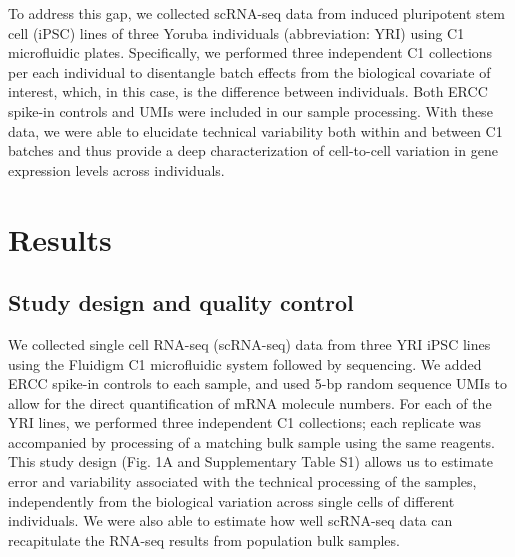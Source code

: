 To address this gap, we collected scRNA-seq data from induced
pluripotent stem cell (iPSC) lines of three Yoruba individuals
(abbreviation: YRI) using C1 microfluidic plates. Specifically, we
performed three independent C1 collections per each individual to
disentangle batch effects from the biological covariate of interest,
which, in this case, is the difference between individuals. Both ERCC
spike-in controls and UMIs were included in our sample processing. With
these data, we were able to elucidate technical variability both within
and between C1 batches and thus provide a deep characterization of
cell-to-cell variation in gene expression levels across individuals.

\section{Results}\label{results}

\subsection{Study design and quality
control}\label{study-design-and-quality-control}

We collected single cell RNA-seq (scRNA-seq) data from three YRI iPSC
lines using the Fluidigm C1 microfluidic system followed by sequencing.
We added ERCC spike-in controls to each sample, and used 5-bp random
sequence UMIs to allow for the direct quantification of mRNA molecule
numbers. For each of the YRI lines, we performed three independent C1
collections; each replicate was accompanied by processing of a matching
bulk sample using the same reagents. This study design (Fig. 1A and
Supplementary Table S1) allows us to estimate error and variability
associated with the technical processing of the samples, independently
from the biological variation across single cells of different
individuals. We were also able to estimate how well scRNA-seq data can
recapitulate the RNA-seq results from population bulk samples.


